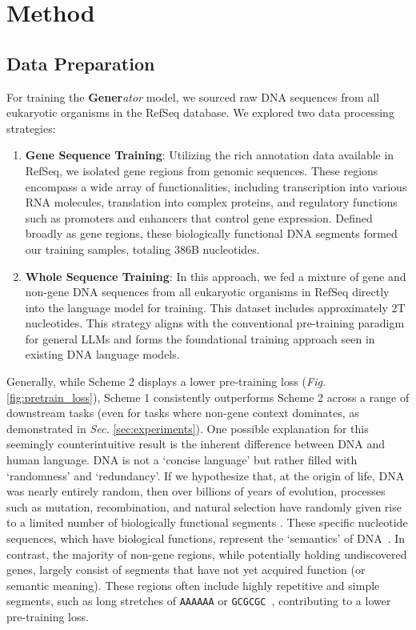 \section{Method}

\subsection{Data Preparation}
\label{sec:data_preparation}
For training the \textbf{Gener}\textit{ator} model, we sourced raw DNA sequences from all eukaryotic organisms in the RefSeq database. We explored two data processing strategies:
\begin{enumerate}
    \item \textbf{Gene Sequence Training}: Utilizing the rich annotation data available in RefSeq, we isolated gene regions from genomic sequences. These regions encompass a wide array of functionalities, including transcription into various RNA molecules, translation into complex proteins, and regulatory functions such as promoters and enhancers that control gene expression. Defined broadly as gene regions, these biologically functional DNA segments formed our training samples, totaling 386B nucleotides.
    \item \textbf{Whole Sequence Training}: In this approach, we fed a mixture of gene and non-gene DNA sequences from all eukaryotic organisms in RefSeq directly into the language model for training. This dataset includes approximately 2T nucleotides. This strategy aligns with the conventional pre-training paradigm for general LLMs and forms the foundational training approach seen in existing DNA language models.
\end{enumerate} 
Generally, while Scheme 2 displays a lower pre-training loss (\textit{Fig.} \ref{fig:pretrain_loss}), Scheme 1 consistently outperforms Scheme 2 across a range of downstream tasks (even for tasks where non-gene context dominates, as demonstrated in \textit{Sec.} \ref{sec:experiments}). One possible explanation for this seemingly counterintuitive result is the inherent difference between DNA and human language. DNA is not a `concise language' but rather filled with `randomness' and `redundancy'. If we hypothesize that, at the origin of life, DNA was nearly entirely random, then over billions of years of evolution, processes such as mutation, recombination, and natural selection have randomly given rise to a limited number of biologically functional segments \cite{MLMSC, hemiplasy}. These specific nucleotide sequences, which have biological functions, represent the `semantics' of DNA~\cite{RefSeq}. In contrast, the majority of non-gene regions, while potentially holding undiscovered genes, largely consist of segments that have not yet acquired function (or semantic meaning). These regions often include highly repetitive and simple segments, such as long stretches of \texttt{AAAAAA} or \texttt{GCGCGC}~\cite{dna-msa}, contributing to a lower pre-training loss.

